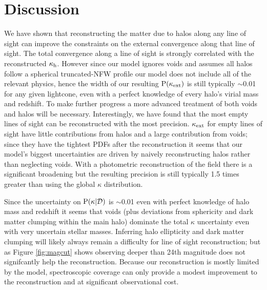 \documentclass[useAMS,usenatbib]{mn2e}
\begin{document}


\section{Discussion}
\label{sec:discuss}

We have shown that reconstructing the matter due to halos along any line of sight can improve the constraints on the external convergence along that line of sight. The total convergence along a line of sight is strongly correlated with the reconstructed $\kappa_{\rm h}$. However since our model ignores voids and assumes all halos follow a spherical truncated-NFW profile our model does not include all of the relevant physics, hence the width of our resulting ${\rm P}(\kappa_{\rm ext})$ is still typically $\sim$0.01 for any given lightcone, even with a perfect knowledge of every halo's virial mass and redshift. To make further progress a more advanced treatment of both voids and halos will be necessary. Interestingly, we have found that the most empty lines of sight can be reconstructed with the most precision. $\kappa_{\rm ext}$ for empty lines of sight have little contributions from halos and a large contribution from voids; since they have the tightest PDFs after the reconstruction it seems that our model's biggest uncertainties are driven by naively reconstructing halos rather than neglecting voids. With a photometric reconstruction of the field there is a significant broadening but the resulting precision is still typically 1.5 times greater than using the global $\kappa$ distribution. 

Since the uncertainty on ${\rm P}(\kappa|\mathcal{D})$ is $\sim$0.01 even with perfect knowledge of halo mass and redshift it seems that voids (plus deviations from sphericity and dark matter clumping within the main halo) dominate the total $\kappa$ uncertainty even with very uncertain stellar masses. Inferring halo ellipticity and dark matter clumping will likely always remain a difficulty for line of sight reconstruction; but as Figure \ref{fig:magcut} shows observing deeper than 24th magnitude does not signifcantly help the reconstruction. Because our reconstruction is mostly limited by the model, spectroscopic coverage can only provide a modest improvement to the reconstruction and at significant observational cost.
\end{document}
